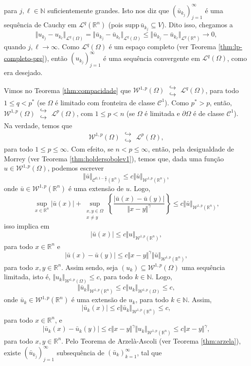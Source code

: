 \documentclass[a4paper, 11pt]{book}
\theoremstyle{definition}
\newcommand{\bN}{\mathbb{N}}
\newcommand{\bR}{\mathbb{R}}
\newcommand{\cC}{\mathcal{C}}
\newcommand{\cL}{\mathcal{L}}
\newcommand{\cW}{\mathcal{W}}
\newcommand{\supp}{\mathrm{supp}\,}
\newcommand{\doublehookrightarrow}{\;\substack{\hookrightarrow \\ \hookrightarrow}\;}
\begin{document}
\begin{prf}
\[    \]
    para $j, \ell \in \bN$ suficientemente grandes.
    Isto nos diz que $(\bar u_{k_j})_{j=1}^\infty$ é uma sequência de Cauchy em $\cL^q(\bR^n)$ (pois $\supp \bar u_{k_j} \subseteq V$).
    Dito isso, chegamos a
    \[
        \Vert u_{k_j} - u_{k_\ell} \Vert_{\cL^q(\Omega)} = \Vert \bar u_{k_j} - \bar u_{k_\ell} \Vert_{\cL^q(\Omega)} \leqslant \Vert \bar u_{k_j} - \bar u_{k_\ell} \Vert_{\cL^q(\bR^n)} \to 0,
    \]
    quando $j,\ell \to \infty$.
    Como $\cL^q(\Omega)$ é um espaço completo (ver Teorema \ref{thm:lp-completo-pre}), então $(u_{k_j})_{j=1}^\infty$ é uma sequência convergente em $\cL^q(\Omega)$, como era desejado.
\end{prf}

Vimos no Teorema \ref{thm:compacidade} que $\cW^{1,p}(\Omega) \doublehookrightarrow \cL^q(\Omega)$, para todo $1 \leqslant q < p^*$ (se $\Omega$ é limitado com fronteira de classe $\cC^1$). Como $p^* > p$, então, $\cW^{1,p}(\Omega) \doublehookrightarrow \cL^p(\Omega)$, com $1 \leqslant p < n$ (se $\Omega$ é limitada e $\partial\Omega$ é de classe $\cC^1$).
Na verdade, temos que
\[
    \cW^{1,p}(\Omega) \doublehookrightarrow \cL^p(\Omega),
\]
para todo $1 \leqslant p \leqslant \infty$.
Com efeito, se $n < p \leqslant \infty$, então, pela desigualdade de Morrey (ver Teorema \ref{thm:holdersobolev1}), temos que, dada uma função $u \in \cW^{1,p}(\Omega)$, podemos escrever
\[
    \Vert \bar u \Vert_{\cC^{0,1-\frac{n}{p}}(\bR^n)} \leqslant c \Vert \bar u \Vert_{\cW^{1,p}(\bR^n)},
\]
onde $\bar u \in \cW^{1,p}(\bR^n)$ é uma extensão de $u$. Logo,
\[
    \sup_{x \in \bR^n} |\bar u(x)| + \sup_{\substack{x,y \in \Omega\\x \neq y}} \left\{ \frac{|\bar u(x) - \bar u(y)|}{\Vert x - y \Vert^\gamma} \right\} \leqslant c \Vert \bar u \Vert_{\cW^{1,p}(\bR^n)},
\]
isso implica em
\[
    |\bar u(x)| \leqslant c \Vert u \Vert_{\cW^{1,p}(\bR^n)},
\]
para todo $x \in \bR^n$ e
\[
    |\bar u(x) - \bar u(y)| \leqslant c \Vert x - y \Vert^\gamma \Vert \bar u \Vert_{\cW^{1,p}(\bR^n)},
\]
para todo $x, y \in \bR^n$.
Assim sendo, seja $(u_k) \subseteq \cW^{1,p}(\Omega)$ uma sequência limitada, isto é, $\Vert u_k \Vert_{\cW^{1,p}(\Omega)} \leqslant c$, para todo $k \in \bN$.
Logo,
\[
    \Vert \bar u_k \Vert_{\cW^{1,p}(\bR^n)} \leqslant c \Vert u_k \Vert_{\cW^{1,p}(\Omega)} \leqslant c,
\]
onde $\bar u_k \in \cW^{1,p}(\bR^n)$ é uma extensão de $u_k$, para todo $k \in \bN$.
Assim,
\[
    |\bar u_k(x)| \leqslant c \Vert \bar u_k \Vert_{\cW^{1,p}(\bR^n)} \leqslant c,
\]
para todo $x \in \bR^n$, e
\[
    | \bar u_k(x) - \bar u_k(y)| \leqslant c \Vert x - y \Vert^\gamma \Vert u_k \Vert_{\cW^{1,p}(\bR^n)} \leqslant c \Vert x - y \Vert^{\gamma},
\]
para todo $x,y \in \bR^n$.
Pelo Teorema de Arzelà-Ascoli (ver Teorema \ref{thm:arzela}), existe $(\bar u_{k_j})_{j=1}^\infty$ subsequência de $(\bar u_k)_{k=1}^\infty$, tal que
\end{document}

